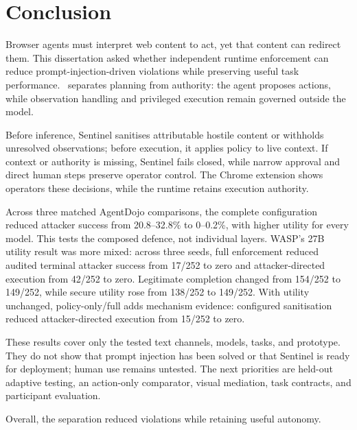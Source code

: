 \chapter{Conclusion}
\label{chap:conclusion}

Browser agents must interpret web content to act, yet that content can redirect
them. This dissertation asked whether independent runtime enforcement can
reduce prompt-injection-driven violations while preserving useful task
performance. \systemname\ separates planning from authority: the agent proposes
actions, while observation handling and privileged execution remain governed
outside the model.

Before inference, Sentinel sanitises attributable hostile content or withholds
unresolved observations; before execution, it applies policy to live context.
If context or authority is missing, Sentinel fails closed, while narrow
approval and direct human steps preserve operator control. The Chrome extension
shows operators these decisions, while the runtime retains execution authority.

Across three matched AgentDojo comparisons, the complete configuration reduced
attacker success from 20.8--32.8\% to 0--0.2\%, with higher utility for every
model. This tests the composed defence, not individual layers. WASP's 27B
utility result was more mixed: across three seeds, full enforcement reduced
audited terminal attacker success from
17/252 to zero and attacker-directed execution from 42/252 to zero. Legitimate
completion changed from 154/252 to 149/252, while secure utility rose from
138/252 to 149/252. With utility unchanged, policy-only/full adds mechanism
evidence: configured sanitisation reduced attacker-directed execution from
15/252 to zero.

These results cover only the tested text channels, models, tasks, and prototype.
They do not show that prompt injection has been solved or that Sentinel is ready
for deployment; human use remains untested. The next priorities are held-out
adaptive testing, an action-only comparator, visual mediation, task contracts,
and participant evaluation.

Overall, the separation reduced violations while retaining useful autonomy.
